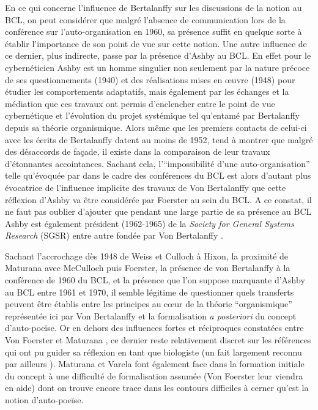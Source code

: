 En ce qui concerne l'influence de Bertalanffy sur les discussions de la notion au BCL, on peut considérer que malgré l'absence de communication lors de la conférence sur l'auto-organisation en 1960, sa présence suffit en quelque sorte à établir l'importance de son point de vue sur cette notion. Une autre influence de ce dernier, plus indirecte, passe par la présence d'Ashby au BCL. En effet pour \autocite[791]{Pouvreau2013} le cybernéticien Ashby est un homme singulier non seulement par la nature précoce de ses questionnements (1940) et des réalisations mises en œuvre (1948) pour étudier les comportements adaptatifs, mais également par les échanges et la médiation que ces travaux ont permis d'enclencher entre le point de vue cybernétique et l'évolution du projet systémique tel qu'entamé par Bertalanffy depuis sa théorie organismique. Alors même que les premiers contacts de celui-ci avec les écrits de Bertalanffy datent au moins de 1952, \textcite[793]{Pouvreau2013} tend à montrer que malgré des désaccords de façade, il existe dans la comparaison de leur travaux d'étonnantes accointances. Sachant cela, l'\enquote{impossibilité d'une auto-organisation} telle qu'évoquée par \textcite{Ashby1962} dans le cadre des conférences du BCL est alors d'autant plus évocatrice de l'influence implicite des travaux de Von Bertalanffy que cette réflexion d'Ashby va être considérée par Foerster au sein du BCL. A ce constat, il ne faut pas oublier d'ajouter que pendant une large partie de sa présence au BCL Ashby est également président (1962-1965) de la \textit{Society for General Systems Research} (SGSR) entre autre fondée par Von Bertalanffy \autocite[826]{Pouvreau2013}.

Sachant l'accrochage dès 1948 de Weiss et Culloch à Hixon, la proximité de Maturana avec McCulloch puis Foerster, la présence de von Bertalanffy à la conférence de 1960 du BCL, et la présence que l'on suppose marquante d'Ashby au BCL entre 1961 et 1970, il semble légitime de questionner quels transferts peuvent être établis entre les principes au cœur de la théorie \enquote{organismique} représentée ici par Von Bertalanffy et la formalisation \textit{a posteriori} du concept d'auto-poeïse. Or en dehors des influences fortes et réciproques constatées entre Von Foerster et Maturana \autocites{Muller2007b}[255-273]{CREA1985}, ce dernier reste relativement discret sur les références qui ont pu guider sa réflexion en tant que biologiste (un fait largement reconnu par ailleurs \autocite[161]{Pangaro2007}). Maturana et Varela font également face dans la formation initiale du concept à une difficulté de formalisation assumée (Von Foerster leur viendra en aide) \autocite[258-263]{CREA1985} dont on trouve encore trace dans les contours difficiles à cerner qu'est la notion d'auto-poeïse.

